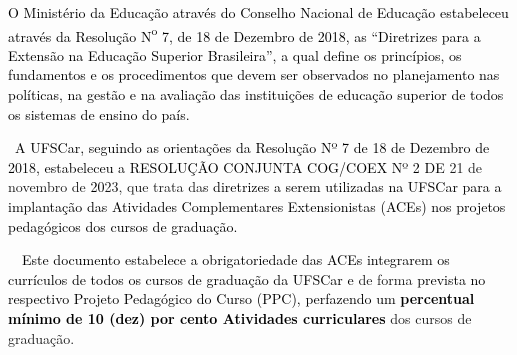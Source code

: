 




%
 




\bigskip

\textcolor{black}{O Ministério da Educação através do Conselho Nacional de Educação estabeleceu através da Resolução
N}\textcolor{black}{\textsuperscript{o}}\textcolor{black}{ 7, de 18 de Dezembro de 2018, as “Diretrizes para a Extensão
na Educação Superior Brasileira”, a qual define os princípios, os fundamentos e os procedimentos que devem ser
observados no planejamento nas políticas, na gestão e na avaliação das instituições de educação superior de todos os
sistemas de ensino do país.}



\textcolor{black}{\ A UFSCar, seguindo as orientações da Resolução Nº 7 de 18 de Dezembro de 2018, estabeleceu a
RESOLUÇÃO CONJUNTA COG/COEX Nº 2 DE }21 de novembro de \textcolor{black} { 20}23, que trata da\textcolor{black}{s
diretrizes a serem utilizadas na UFSCar para a implantação das Atividades Complementares Extensionistas (ACEs)}
\textcolor{black}{nos projetos pedagógicos dos cursos de graduação.}

\textcolor{black}{\ \ Este documento estabelece a obrigatoriedade das ACEs integrarem os currículos de todos os cursos
de graduação da UFSCar e }de forma\textcolor{black}{ prevista no respectivo Projeto Pedagógico do Curso (PPC),
perfazendo um }\textbf{\textcolor{black}{percentual mínimo de 10 (dez) por cento Atividades curriculares}} dos cursos de
graduação.\textcolor{black}{ }



